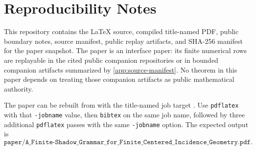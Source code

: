 \section{Reproducibility Notes}
\label{app:reproducibility}

This repository contains the LaTeX source, compiled title-named PDF, public boundary notes, source manifest, public replay artifacts, and SHA-256 manifest for the paper snapshot.  The paper is an interface paper: its finite numerical rows are replayable in the cited public companion repositories or in bounded companion artifacts summarized by \cref{app:source-manifest}.  No theorem in this paper depends on treating those companion artifacts as public mathematical authority.

The paper can be rebuilt from  with the title-named job target
.  Use \texttt{pdflatex} with that \texttt{-jobname} value, then \texttt{bibtex} on the same job name, followed by three additional \texttt{pdflatex} passes with the same \texttt{-jobname} option.  The expected output is
\[
\texttt{paper/A\_Finite-Shadow\_Grammar\_for\_Finite\_Centered\_Incidence\_Geometry.pdf}.
\]